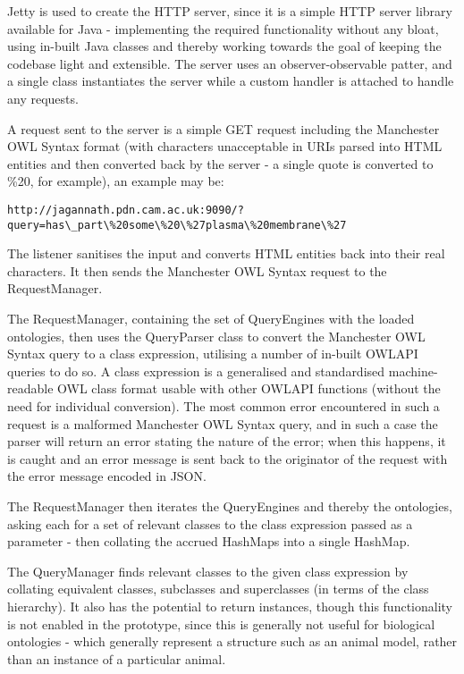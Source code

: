 \documentclass{article}
\begin{document}
Jetty is used to create the HTTP server, since it is a simple HTTP server
library available for Java - implementing the required functionality without any
bloat, using in-built Java classes and thereby working towards the goal of
keeping the codebase light and extensible. The server uses an
observer-observable patter, and a single class instantiates the server while a
custom handler is attached to handle any requests.

A request sent to the server is a simple GET request including the Manchester
OWL Syntax format (with characters unacceptable in URIs parsed into HTML
entities and then converted back by the server - a single quote is converted to
\%20, for example), an example may be:

\begin{lstlisting}
http://jagannath.pdn.cam.ac.uk:9090/?query=has\_part\%20some\%20\%27plasma\%20membrane\%27
\end{lstlisting}

The listener sanitises the input and converts HTML entities back into their real
characters. It then sends the Manchester OWL Syntax request to the
RequestManager. 

The RequestManager, containing the set of QueryEngines with the loaded
ontologies, then uses the QueryParser class to convert the Manchester OWL Syntax 
query to a class expression, utilising a number of in-built OWLAPI queries to do
so. A class expression is a generalised and standardised machine-readable OWL
class format usable with other OWLAPI functions (without the need for individual
conversion). The most common error encountered in such a request is a malformed
Manchester OWL Syntax query, and in such a case the parser will return an error
stating the nature of the error; when this happens, it is caught and an error
message is sent back to the originator of the request with the error message
encoded in JSON.

The RequestManager then iterates the QueryEngines and thereby the
ontologies, asking each for a set of relevant classes to the class expression
passed as a parameter - then collating the accrued HashMaps into a single
HashMap.

The QueryManager finds relevant classes to the given class expression by
collating equivalent classes, subclasses and superclasses (in terms of the class
hierarchy). It also has the potential to return instances, though this
functionality is not enabled in the prototype, since this is generally not
useful for biological ontologies - which generally represent a structure such as
an animal model, rather than an instance of a particular animal.
\end{document}
